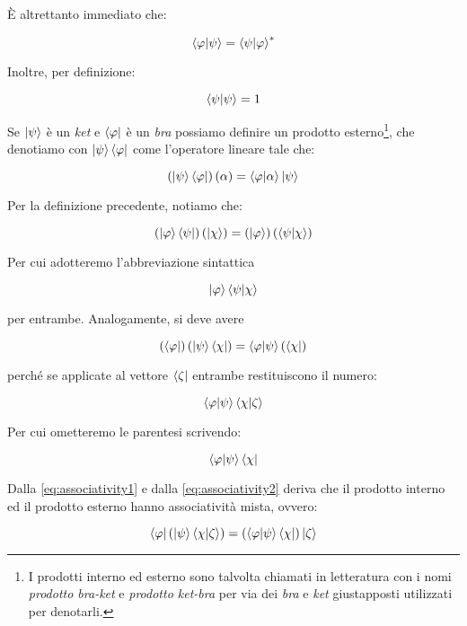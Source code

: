 È altrettanto immediato che:

	\begin{equation} \label{eq:conjugateBrakets}
		\braket{\varphi}{\psi} = \braket{\psi}{\varphi}^*
	\end{equation}

Inoltre, per definizione:

	\begin{equation} \label{eq:normalizedVectors}
		\braket{\psi}{\psi} = 1
	\end{equation}

Se $\ket{\psi}$ è un \textit{ket} e $\bra{\varphi}$ è un \textit{bra} possiamo definire un prodotto esterno\footnote{I prodotti interno ed esterno sono talvolta chiamati in letteratura con i nomi \textit{prodotto bra-ket} e \textit{prodotto ket-bra} per via dei \textit{bra} e \textit{ket} giustapposti utilizzati per denotarli.}, che denotiamo con $\ket{\psi}\bra{\varphi}$ come l'operatore lineare tale che:

	\begin{equation} \label{eq:outerProduct}
		\left( \ket{\psi}\bra{\varphi} \right)(\alpha) = \braket{\varphi}{\alpha} \ket{\psi}
	\end{equation}

Per la definizione precedente, notiamo che:

	\begin{equation} \label{eq:associativity1}
		\left ( \ket{\varphi} \bra{\psi} \right ) \left ( \ket{ \chi } \right ) = \left ( \ket{\varphi} \right ) \left ( \braket{\psi}{\chi} \right )
	\end{equation}

Per cui adotteremo l'abbreviazione sintattica

	\[
		\ket{\varphi}\braket{\psi}{\chi}
	\]

per entrambe. Analogamente, si deve avere

	\begin{equation} \label{eq:associativity2}
		\left( \bra{\varphi} \right ) \left ( \ket{\psi} \bra{\chi} \right ) = \braket{\varphi}{\psi} \left (\bra{\chi} \right )
	\end{equation}

perché se applicate al vettore $\bra{\zeta}$ entrambe restituiscono il numero:
	
	\[
		\braket{\varphi}{\psi}\braket{\chi}{\zeta}
	\]

Per cui ometteremo le parentesi scrivendo:

	\[
		\braket{\varphi}{\psi}\bra{\chi}
	\]

Dalla \eqref{eq:associativity1} e dalla \eqref{eq:associativity2} deriva che il prodotto interno ed il prodotto esterno hanno associatività mista, ovvero:

	\begin{equation}
		\bra{\varphi} \left( \ket{\psi} \braket{\chi}{\zeta} \right ) =
		\left ( \braket{\varphi}{\psi} \bra{\chi} \right ) \ket{\zeta}
	\end{equation}
